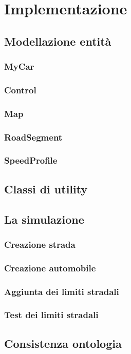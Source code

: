 \chapter{Implementazione}

\section{Modellazione entit\`a}
\subsection{MyCar}
\subsection{Control}
\subsection{Map}
\subsection{RoadSegment}
\subsection{SpeedProfile}

\section{Classi di utility}

\section{La simulazione}
\subsection{Creazione strada}
\subsection{Creazione automobile}
\subsection{Aggiunta dei limiti stradali}
\subsection{Test dei limiti stradali}

\section{Consistenza ontologia}

